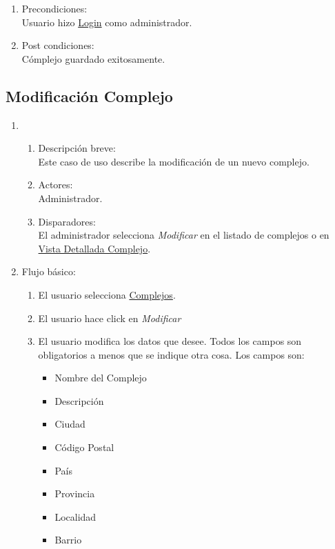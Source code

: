 \documentclass[a4paper,11pt]{article}
\begin{document}
\begin{enumerate}
    \item Precondiciones: \\
        Usuario hizo \underline{Login} como administrador.

    \item Post condiciones: \\
        C\'omplejo guardado exitosamente.

\end{enumerate}

\subsection{Modificaci\'on Complejo}
\begin{enumerate}

    \item
    \begin{enumerate}
    \item Descripci\'on breve: \\
        Este caso de uso describe la modificaci\'on de un nuevo complejo.
    \item Actores: \\
        Administrador.
    \item Disparadores: \\
        El administrador selecciona \emph{Modificar} en el listado de complejos o en \underline{Vista Detallada Complejo}.
    \end{enumerate} 
    \item Flujo b\'asico:
		\begin{enumerate}
        		\item El usuario selecciona \underline{Complejos}.
                        \item El usuario hace click en \emph{Modificar}
			\item El usuario modifica los datos que desee. Todos los campos son obligatorios a menos que se indique otra cosa. Los campos son: 
			\begin{itemize}
				 \item Nombre del Complejo
				 \item Descripci\'on
				 \item Ciudad
				 \item C\'odigo Postal
				 \item Pa\'is
		                 \item Provincia
				 \item Localidad
				 \item Barrio

\end{itemize}
\end{enumerate}
\end{enumerate}
\end{document}
